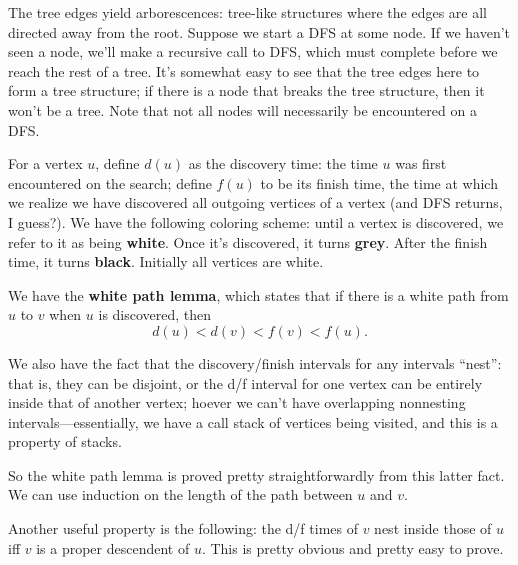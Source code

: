 \documentclass{article}
\begin{document}
The tree edges yield arborescences: tree-like structures where the edges
are all directed away from the root.
Suppose we start a DFS at some node. If we haven't seen a node, we'll
make a recursive call to DFS, which must complete before we reach
the rest of a tree. It's somewhat easy to see that the tree edges
here to form a tree structure; if there is a node that breaks the tree structure,
then it won't be a tree.
Note that not all nodes will necessarily be encountered on a DFS.

For a vertex $u$, define $d(u)$ as the discovery time: the time
$u$ was first encountered on the search; define $f(u)$ to be
its finish time, the time at which we realize we have discovered all
outgoing vertices of a vertex (and DFS returns, I guess?).
We have the following coloring scheme: until a vertex is discovered,
we refer to it as being \textbf{white}. Once it's discovered, it turns
\textbf{grey}. After the finish time, it turns \textbf{black}. Initially
all vertices are white.

We have the \textbf{white path lemma}, which states that if there is a white
path from $u$ to $v$ when $u$ is discovered, then 
$$d(u) < d(v) < f(v) < f(u).$$

We also have the fact that the discovery/finish intervals for any intervals
``nest'': that is, they can be disjoint, or the d/f interval for one
vertex can be entirely inside that of another vertex; hoever we can't
have overlapping nonnesting intervals---essentially, we have a call stack of 
vertices being visited, and this is a property of stacks.

So the white path lemma is proved pretty straightforwardly from this
latter fact. We can use induction on the length of the path between
$u$ and $v$.

Another useful property is the following: the d/f times of
$v$ nest inside those of $u$ iff $v$ is a proper descendent of $u$.
This is pretty obvious and pretty easy to prove.
\end{document}
